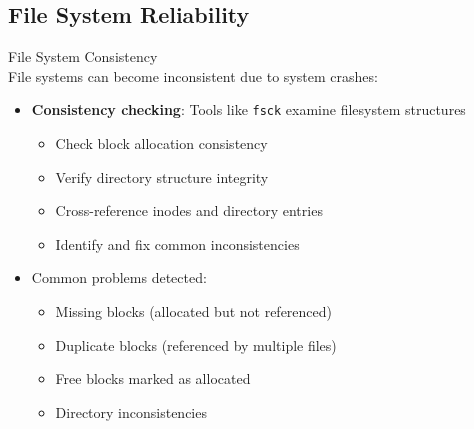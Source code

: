 \subsection{File System Reliability}

\begin{definition}{File System Consistency}\\
    File systems can become inconsistent due to system crashes:
    \begin{itemize}
        \item \textbf{Consistency checking}: Tools like \texttt{fsck} examine filesystem structures
            \begin{itemize}
                \item Check block allocation consistency
                \item Verify directory structure integrity
                \item Cross-reference inodes and directory entries
                \item Identify and fix common inconsistencies
            \end{itemize}
        \item Common problems detected:
            \begin{itemize}
                \item Missing blocks (allocated but not referenced)
                \item Duplicate blocks (referenced by multiple files)
                \item Free blocks marked as allocated
                \item Directory inconsistencies
            \end{itemize}
    \end{itemize}
\end{definition}

